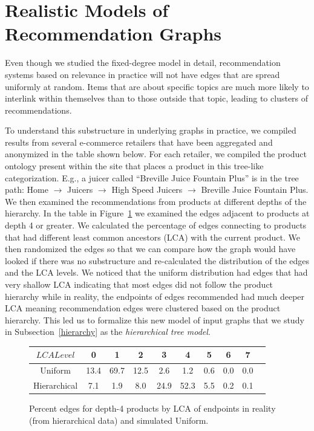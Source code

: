 \section{Realistic Models of Recommendation Graphs}
Even though we studied the fixed-degree model in detail, recommendation systems based on relevance in practice
will not have edges that are spread uniformly at random. Items that are
about specific topics are much more likely to interlink within
themselves than to those outside that topic, leading to
clusters of recommendations.

To understand this substructure in underlying
graphs in practice, we compiled results from several e-commerce retailers that
have been aggregated and anonymized in the table shown below. For each
retailer, we compiled the product ontology present within the
site that places a product in this tree-like categorization. E.g., a
juicer called ``Breville Juice Fountain Plus'' is in the tree path:
Home $\rightarrow$ Juicers $\rightarrow$ High Speed Juicers
$\rightarrow$ Breville Juice Fountain Plus. We then examined the
recommendations from products at different depths of the hierarchy. In
the table in Figure~\ref{fig:hier} we examined the edges adjacent to
products at depth 4 or greater. We calculated the percentage of edges
connecting to products that had different least common ancestors (LCA) with the current product.  We
then randomized the edges so that we can compare how the graph would
have looked if there was no substructure and re-calculated the
distribution of the edges and the LCA levels. We noticed that the
uniform distribution had edges that had very shallow LCA indicating that
most edges did not follow the product hierarchy while in reality,
the endpoints of edges recommended had much deeper LCA meaning recommendation edges were clustered based on the product hierarchy. This led us
to formalize this new model of input graphs that we study in Subsection~\ref{hierarchy}
as the {\em hierarchical tree model}.

\begin{figure}[h]
  \centering
  \begin{tabular}{ |c|c|c|c|c|c|c|c|c|c| }
    \hline
    $LCA Level$ & 0 & 1 & 2 & 3 & 4 & 5 & 6 & 7 \\ \hline
    Uniform & 13.4 & 69.7 & 12.5 & 2.6 & 1.2 & 0.6 & 0.0 & 0.0 \\ \hline
    Hierarchical & 7.1 & 1.9 & 8.0 & 24.9 & 52.3 & 5.5 & 0.2 & 0.1\\
    \hline
  \end{tabular}
  \caption{Percent edges for depth-4 products by LCA of endpoints in reality (from hierarchical data) and simulated Uniform.}\label{fig:hier}
\end{figure}

